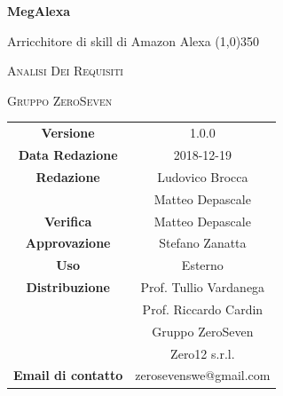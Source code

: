 \documentclass[a4paper,12pt]{book}
\author{Ludovico Brocca}
\date{2018-12-19}
\begin{document}
\begin{titlepage}
	\centering
	{\huge\bfseries MegAlexa \par}
	Arricchitore di skill di Amazon Alexa
	\line(1,0){350} \\
	{\scshape\LARGE Analisi Dei Requisiti \par}
	\vspace{1cm}
	{\scshape Gruppo ZeroSeven \par}
	\logo
	\begin{tabular}{c|c}
		{\hfill \textbf{Versione}} 			& 1.0.0				\\
		{\hfill\textbf{Data Redazione}} 	& 2018-12-19		\\ 
		{\hfill\textbf{Redazione}} 			&  		Ludovico Brocca \\ & Matteo Depascale	\\	
		{\hfill\textbf{Verifica}} 				&  	Matteo Depascale			\\ 
		{\hfill\textbf{Approvazione}} 		&  		Stefano Zanatta			\\ 
		{\hfill\textbf{Uso}} 					& 		Esterno		\\ 
		{\hfill\textbf{Distribuzione}} 			& 			Prof. Tullio Vardanega \\ & Prof. Riccardo Cardin \\ & Gruppo ZeroSeven	\\ & Zero12 s.r.l. \\
		{\hfill\textbf{Email di contatto}} & zerosevenswe@gmail.com \\
	\end{tabular}
\end{titlepage}
	

	
	\label{LastFrontPage}
	\newpage	
	
	\pagestyle{mymain}
	\tableofcontents
	\listoffigures
	\listoftables
	
	
	
	
	
	\label{LastPage}
\end{document}
